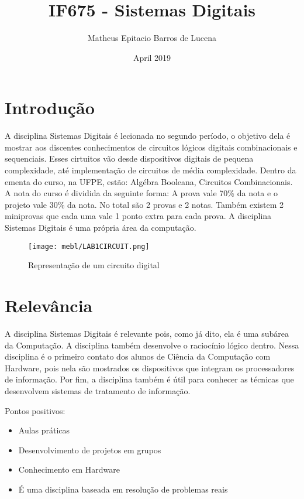 \documentclass[10pt]{article}
\title{IF675 - Sistemas Digitais}
\author{Matheus Epitacio Barros de Lucena}
\date{April 2019}
\begin{document}
\maketitle

\section{Introdução}
A disciplina Sistemas Digitais é lecionada no segundo período, o objetivo dela é mostrar aos discentes conhecimentos de circuitos lógicos digitais combinacionais e sequenciais. Esses cirtuitos vão desde dispositivos digitais de pequena complexidade, até implementação de circuitos de média complexidade. Dentro da ementa do curso, na UFPE, estão: Algébra Booleana, Circuitos Combinacionais. A nota do curso é dividida da seguinte forma: A prova vale 70\% da nota e o projeto vale 30\% da nota. No total são 2 provas e 2 notas. Também existem 2 miniprovas que cada uma vale 1 ponto extra para cada prova. A disciplina Sistemas Digitais é uma própria área da computação.   %

\begin{figure}[h]
    \centering
\texttt{[image: mebl/LAB1CIRCUIT.png]}
    \label{fig:my_label}
    \caption{Representação de um circuito digital \cite{imagem}}
    
    
\end{figure}
\section{Relevância}
A disciplina Sistemas Digitais é relevante pois, como já dito, ela é uma subárea da Computação. A disciplina também desenvolve o raciocínio lógico dentro. Nessa disciplina é o primeiro contato dos alunos de Ciência da Computação com Hardware, pois nela são mostrados os dispositivos que integram os processadores de informação. Por fim, a disciplina também é útil para conhecer as técnicas que desenvolvem sistemas de tratamento de informação.

Pontos positivos:
\begin{itemize}
    \item Aulas práticas
    \item Desenvolvimento de projetos em grupos
    \item Conhecimento em Hardware
    \item É uma disciplina baseada em resolução de problemas reais
\end{itemize}
\end{document}
